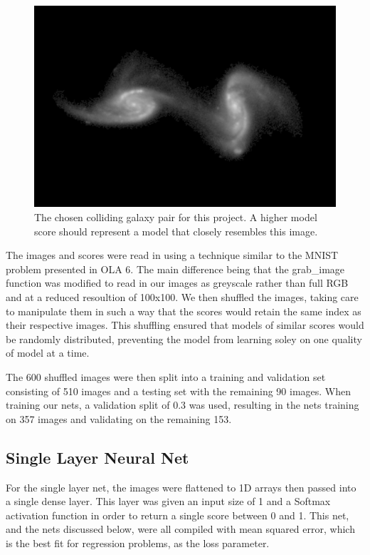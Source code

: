 \documentclass[conference]{IEEEtran}
\begin{document}
\begin{figure}[htbp]
\centerline{\includegraphics[width=0.75\linewidth]{./Images/target.png}}
\caption{The chosen colliding galaxy pair for this project. A higher model score should represent a model that closely resembles this image.}
\label{fig:TargetGalaxy}
\end{figure}

The images and scores were read in using a technique similar to the MNIST problem presented in OLA 6. The main difference being that the grab\_image function was modified to read in our images as greyscale rather than full RGB and at a reduced resoultion of 100x100. We then shuffled the images, taking care to manipulate them in such a way that the scores would retain the same index as their respective images. This shuffling ensured that models of similar scores would be randomly distributed, preventing the model from learning soley on one quality of model at a time. 

The 600 shuffled images were then split into a training and validation set consisting of 510 images and a testing set with the remaining 90 images. When training our nets, a validation split of 0.3 was used, resulting in the nets training on 357 images and validating on the remaining 153.

\subsection{Single Layer Neural Net}

For the single layer net, the images were flattened to 1D arrays then passed into a single dense layer. This layer was given an input size of 1 and a Softmax activation function in order to return a single score between 0 and 1. This net, and the nets discussed below, were all compiled with mean squared error, which is the best fit for regression problems, as the loss parameter.
\end{document}
